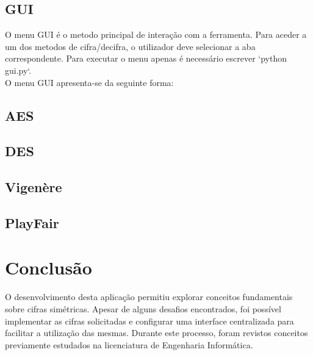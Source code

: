 \documentclass[a4paper]{article}
\begin{document}
\subsection{GUI}
O menu GUI é o metodo principal de interação com a ferramenta. Para aceder a um dos metodos de cifra/decifra, o utilizador deve selecionar a aba correspondente.
Para executar o menu apenas é necessário escrever `python gui.py`.\\

O menu GUI apresenta-se da seguinte forma:


\newpage
\subsection{AES}

\newpage
\subsection{DES}

\newpage
\subsection{Vigenère}

\newpage
\subsection{PlayFair}

\newpage
\section{Conclusão}\label{con}
O desenvolvimento desta aplicação permitiu explorar conceitos fundamentais sobre cifras simétricas.
Apesar de alguns desafios encontrados, foi possível implementar as
cifras solicitadas e configurar uma interface centralizada para facilitar a utilização das mesmas.
Durante este processo, foram revistos conceitos previamente estudados na licenciatura de Engenharia Informática.

\newpage
\renewcommand{\refname}{Bibliografia} %
\renewcommand{\bibname}{Bibliografia} %
\printbibliography
\end{document}
